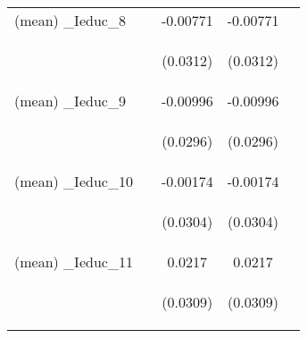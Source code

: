 \documentclass[]{article}
\begin{document}
\begin{center}
\begin{tabular}{lcccc}
(mean) \_Ieduc\_8 &  & -0.00771 & -0.00771 &  \\
\vspace{4pt} & \begin{footnotesize}\end{footnotesize} & \begin{footnotesize}(0.0312)\end{footnotesize} & \begin{footnotesize}(0.0312)\end{footnotesize} & \begin{footnotesize}\end{footnotesize} \\
(mean) \_Ieduc\_9 &  & -0.00996 & -0.00996 &  \\
\vspace{4pt} & \begin{footnotesize}\end{footnotesize} & \begin{footnotesize}(0.0296)\end{footnotesize} & \begin{footnotesize}(0.0296)\end{footnotesize} & \begin{footnotesize}\end{footnotesize} \\
(mean) \_Ieduc\_10 &  & -0.00174 & -0.00174 &  \\
\vspace{4pt} & \begin{footnotesize}\end{footnotesize} & \begin{footnotesize}(0.0304)\end{footnotesize} & \begin{footnotesize}(0.0304)\end{footnotesize} & \begin{footnotesize}\end{footnotesize} \\
(mean) \_Ieduc\_11 &  & 0.0217 & 0.0217 &  \\
\vspace{4pt} & \begin{footnotesize}\end{footnotesize} & \begin{footnotesize}(0.0309)\end{footnotesize} & \begin{footnotesize}(0.0309)\end{footnotesize} & \begin{footnotesize}\end{footnotesize} \\

\end{tabular}
\end{center}
\end{document}
